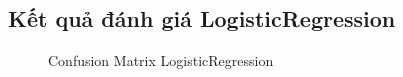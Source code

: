 \documentclass[12pt,a4paper,oneside]{book}
\begin{document}
	\subsection{Kết quả đánh giá LogisticRegression}
		\begin{figure}[H]
			\hfill
			\hfill
			\caption{Confusion Matrix LogisticRegression} 
		\end{figure}
\end{document}
